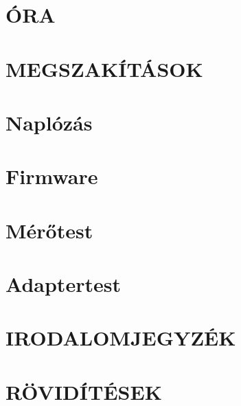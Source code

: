 \section{ÓRA}

\clearpage
\section{MEGSZAKÍTÁSOK}

\clearpage
\section{Naplózás}

\clearpage
\section{Firmware}

\clearpage
\section{Mérőtest}

\clearpage
\section{Adaptertest}


%












\clearpage
\section{IRODALOMJEGYZÉK}
\printbibliography[heading=none]

\clearpage
\renewcommand{\listfigurename}{ÁBRAJEGYZÉK}
\listoffigures

\clearpage
\renewcommand{\listtablename}{TÁBLAJEGYZÉK}
\listoftables

\clearpage
\section{RÖVIDÍTÉSEK}








